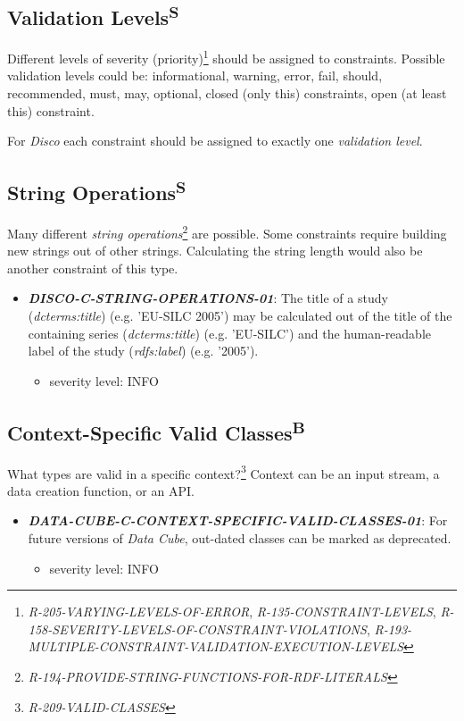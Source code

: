 \documentclass{llncs}
\begin{document}
\subsection{Validation Levels\textsuperscript{S}}

Different levels of severity (priority)\footnote{\emph{R-205-VARYING-LEVELS-OF-ERROR}, \emph{R-135-CONSTRAINT-LEVELS}, \emph{R-158-SEVERITY-LEVELS-OF-CONSTRAINT-VIOLATIONS}, \emph{R-193-MULTIPLE-CONSTRAINT-VALIDATION-EXECUTION-LEVELS}} should be assigned to constraints.
Possible validation levels could be: informational, warning, error, fail, should, recommended, must, may, optional, closed (only this) constraints, open (at least this) constraint.

For \emph{Disco} each constraint should be assigned to exactly one \emph{validation level}.

\subsection{String Operations\textsuperscript{S}}

Many different \emph{string operations}\footnote{\emph{R-194-PROVIDE-STRING-FUNCTIONS-FOR-RDF-LITERALS}} are possible.
Some constraints require building new strings out of other strings.
Calculating the string length would also be another constraint of this type.

\begin{itemize}
	\item \textbf{{\em DISCO-C-STRING-OPERATIONS-01}}: The title of a study (\emph{dcterms:title}) (e.g. 'EU-SILC 2005') may be calculated out of the title of the containing series (\emph{dcterms:title}) (e.g. 'EU-SILC') and the human-readable label of the study (\emph{rdfs:label}) (e.g. '2005').   
	\begin{itemize}
		\item severity level: INFO
	\end{itemize}
\end{itemize}

\subsection{Context-Specific Valid Classes\textsuperscript{B}}

What types are valid in a specific context?\footnote{\emph{R-209-VALID-CLASSES}} 
Context can be an input stream, a data creation function, or an API.

\begin{itemize}
	\item \textbf{{\em DATA-CUBE-C-CONTEXT-SPECIFIC-VALID-CLASSES-01}}: For future versions of \emph{Data Cube}, out-dated classes can be marked as deprecated.
	\begin{itemize}
		\item severity level: INFO
	\end{itemize}
\end{itemize}
\end{document}
